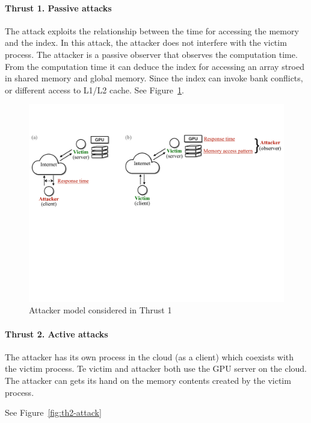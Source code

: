 \paragraph{Thrust 1. Passive attacks}
The attack exploits the relationship between
the time for accessing the memory and the index.
%
In this attack, the attacker does not interfere with the victim process.
%
The attacker is a passive observer that observes the computation time. 
%
From the computation time it can deduce the index for accessing an array stroed in shared memory and global memory.
%
Since the index can invoke bank conflicts, or different access to L1/L2 cache. 
%
See Figure~\ref{fig:th1-attack}.
\begin{figure}[h]
    \includegraphics[clip,trim=0 10cm 0 2cm,width=0.72\pdfpagewidth]{figs/thrust1-fig.pdf}
    \caption{Attacker model considered in Thrust 1 }
    \label{fig:th1-attack}
    \end{figure}

\paragraph{Thrust 2. Active attacks}
The attacker has its own process in the cloud (as a client) which coexists with the victim process.
%
Te victim and attacker both use the GPU server on the cloud.
%
The attacker can gets its hand on the memory contents created by the victim process.

See Figure~\ref{fig:th2-attack}

